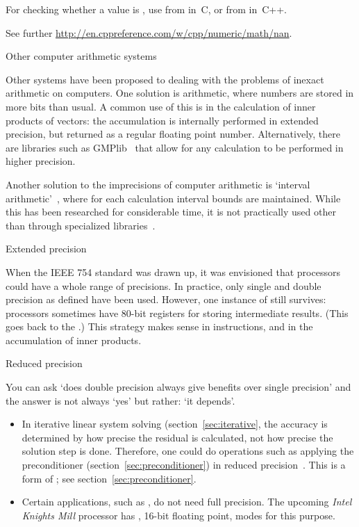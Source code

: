 For checking whether a value is , use  from  in~C, or
 from  in~C++.

See further \url{http://en.cppreference.com/w/cpp/numeric/math/nan}.


 {Other computer arithmetic systems}

Other systems have been proposed to dealing with the problems of
inexact arithmetic on computers. One solution is 
arithmetic, where numbers are stored in more bits than usual. A common
use of this is in the calculation of inner products of vectors: the
accumulation is internally performed in extended precision, but
returned as a regular floating point number. Alternatively, there are
libraries such as GMPlib~\cite{gmplib} that allow for any calculation
to be performed in higher precision.

Another solution to the imprecisions of computer arithmetic is `interval
arithmetic'~\cite{wikipedia:interval-arithmetic}, where for each
calculation interval bounds are maintained. While this has been
researched for considerable time, it is not practically used other
than through specialized libraries~\cite{boost:interval-arithmetic}.

 {Extended precision}
\label{sec:ext-prec}

When the IEEE 754 standard was drawn up, it was envisioned that 
processors could have a whole range of precisions. In practice,
only single and double precision as defined have been used.
However, one instance of  still survives:
processors sometimes have 80-bit registers for storing intermediate results.
(This goes back to the .)
This strategy makes sense in  instructions, 
and in the accumulation of inner products.

 {Reduced precision}

You can ask `does double precision always give benefits over single
precision' and the answer is not always `yes' but rather: `it
depends'.
\begin{itemize}
\item In iterative linear system solving (section~\ref{sec:iterative}, the accuracy is determined
  by how precise the residual is calculated, not how precise the
  solution step is done. Therefore, one could do
  operations such as applying the preconditioner
  (section~\ref{sec:preconditioner}) in reduced
  precision~\cite{Dongarra:mixed-refinement}. This is a form of
  ; see section~\ref{sec:preconditioner}.
\item Certain applications, such as , do not
  need full precision. The upcoming
  \emph{Intel Knights Mill}
  processor has , 16-bit floating
  point, modes for this purpose.
\end{itemize}

